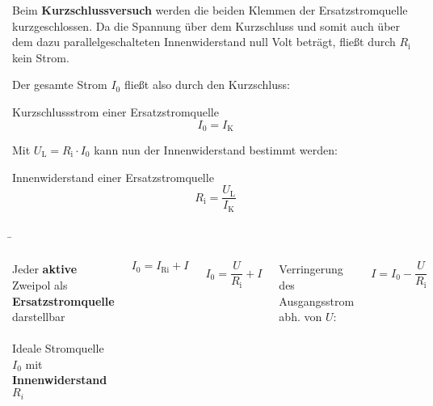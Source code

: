 \begin{frame}
{	Beim \textbf{Kurzschlussversuch} werden die beiden Klemmen der Ersatzstromquelle kurzgeschlossen. 
	Da die Spannung über dem Kurzschluss und somit
	auch über dem dazu parallelgeschalteten Innenwiderstand null Volt beträgt, fließt durch 
	$R_\mathrm{i}$ kein Strom.
	
	Der gesamte Strom $I_0$ fließt also durch den Kurzschluss:

	

	\begin{Merksatz}{Kurzschlussstrom einer Ersatzstromquelle}{}
		\begin{equation*}
			I_0 = I_\mathrm{K}
		\end{equation*}
	\end{Merksatz}




	Mit $U_\mathrm{L} = R_\mathrm{i} \cdot I_0$ kann nun der Innenwiderstand bestimmt werden:

	\begin{Merksatz}{Innenwiderstand einer Ersatzstromquelle}{}
		\begin{equation*}
			R_\mathrm{i} = \frac{U_\mathrm{L}}{I_\mathrm{K}}
		\end{equation*}
	\end{Merksatz}



	



	}
   \b{

	\begin{columns}


	Jeder \textbf{aktive} Zweipol als \textbf{Ersatzstromquelle} darstellbar\\

	\phantom{text}\\
	
	Ideale Stromquelle $I_0$ mit 
	\textbf{Innenwiderstand} $R_i$ 

	\begin{equation*}
		I_0 = I_\mathrm{Ri} + I
	\end{equation*}

	\begin{equation*}
		I_0 =\frac{U}{R_\mathrm{i}} + I
	\end{equation*}

	Verringerung des Ausgangsstrom abh. von $U$:

	\begin{equation*}
		I = I_0 - \frac{U}{R_\mathrm{i}}
	\end{equation*}








\end{columns}}
\end{frame}
